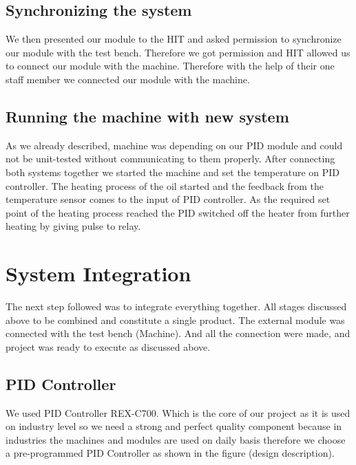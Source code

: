 \documentclass[14pt]{report}
\begin{document}
\subsection{\textbf{Synchronizing the system}}

We then presented our module to the HIT and asked permission to synchronize our module with the test bench. Therefore we got permission and HIT allowed us to connect our module with the machine. Therefore with the help of their one staff member we connected our module with the machine.


\subsection{\textbf{Running the machine with new system}}

As we already described, machine was depending on our PID module and could not be unit-tested without communicating to them properly. After connecting both systems together we started the machine and set the temperature on PID controller. The heating process of the oil started and the feedback from the temperature sensor comes to the input of PID controller. As the required set point of the heating process reached the PID switched off the heater from further heating by giving pulse to relay.

\section{\textbf{System Integration}}

The next step followed was to integrate everything together. All stages discussed above to be combined and constitute a single product. The external module was connected with the test bench (Machine). And all the connection were made, and project was ready to execute as discussed above.

\subsection{\textbf{PID Controller}}

We used PID Controller REX-C700. Which is the core of our project as it is used on industry level so we need a strong and perfect quality component because in industries the machines and modules are used on daily basis therefore we choose a pre-programmed PID Controller as shown in the figure (design description). 

\vspace{3mm}
\end{document}
